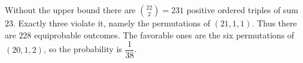 Without the upper bound there are $\binom{22}2=231$ positive ordered triples of sum $23$. Exactly three violate it, namely the permutations of $(21,1,1)$. Thus there are $228$ equiprobable outcomes. The favorable ones are the six permutations of $(20,1,2)$, so the probability is $\boxed{\dfrac{1}{38}}$.
